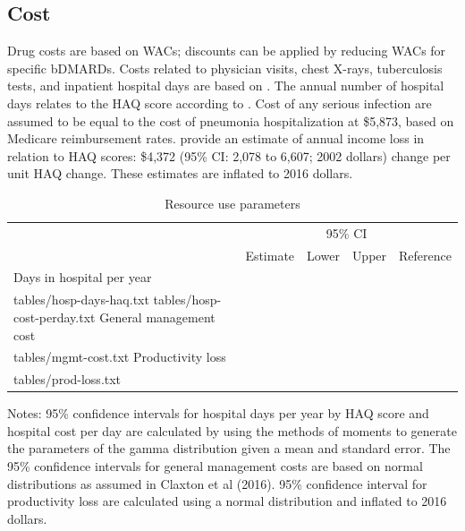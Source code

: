 \documentclass[11pt,final,fleqn]{article}\usepackage[]{graphicx}\usepackage[]{color}
\makeatletter
\theoremstyle{plain}
\newcommand*\ExpandableInput[1]{\@@input#1 }
\makeatother
\begin{document}
\subsection{Cost}\label{cost}
Drug costs are based on WACs; discounts can be applied by reducing WACs for specific bDMARDs. Costs related to physician visits, chest X-rays, tuberculosis tests, and inpatient hospital days are based on \citet{claxton2016economic}. The annual number of hospital days relates to the HAQ score according to \citet{carlson2015economic}. Cost of any serious infection are assumed to be equal to the cost of pneumonia hospitalization at \$5,873, based on Medicare reimbursement rates. \citet{wolfe2005household} provide an estimate of annual income loss in relation to HAQ scores: \$4,372 (95\% CI: 2,078 to 6,607; 2002 dollars) change per unit HAQ change. These estimates are inflated to 2016 dollars.



\begin{table}[!ht]
\begin{center}
\begin{threeparttable}
\caption{Resource use parameters} \label{tbl:resource-use-pars}
\footnotesize
\begin{tabularx}{\textwidth}{@{\extracolsep{\fill}}lcccc}
\hline
\multicolumn{2}{l}{} & \multicolumn{2}{c}{95\% CI} & \multicolumn{1}{l}{} \\
\cmidrule{3-4} 
\multicolumn{1}{l}{} & \multicolumn{1}{l}{Estimate} & \multicolumn{1}{c}{Lower} & \multicolumn{1}{c}{Upper} & \multicolumn{1}{c}{Reference} \\
\hline
Days in hospital per year \\
\ExpandableInput{tables/hosp-days-haq.txt}
\ExpandableInput{tables/hosp-cost-perday.txt}
General management cost \\
\ExpandableInput{tables/mgmt-cost.txt}
Productivity loss \\
\ExpandableInput{tables/prod-loss.txt}
\hline
\end{tabularx}
\scriptsize
Notes: 95\% confidence intervals for hospital days per year by HAQ score and hospital cost per day are calculated by using the methods of moments to generate the parameters of the gamma distribution given a mean and standard error. The 95\% confidence intervals for general management costs are based on normal distributions as assumed in Claxton et al (2016). 95\% confidence interval for productivity loss are calculated using a normal distribution and inflated to 2016 dollars. 
\end{threeparttable}
\end{center}
\end{table}
\end{document}
